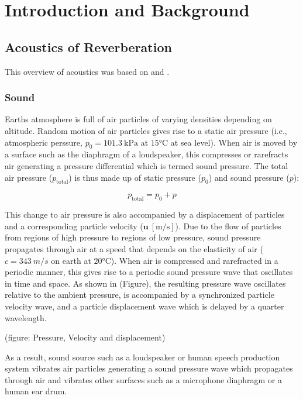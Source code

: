 \chapter{Introduction and Background}

\section{Acoustics of Reverberation}

This overview of acoustics was based on \cite{beranek2012acoustics} and \cite{kuttruff2016room}.

\subsection{Sound}

Earths atmosphere is full of air particles of varying densities depending on altitude. Random motion of air particles gives rise to a static air pressure (i.e., atmospheric perssure, $p_0 = \qty{101.3}{\kilo\pascal}$ at $15\unit{\degreeCelsius}$ at sea level). When air is moved by a surface such as the diaphragm of a loudspeaker, this compresses or rarefracts air generating a pressure differential which is termed sound pressure. The total air pressure ($p_\mathrm{total}$) is thus made up of static pressure ($p_0$) and sound pressure ($p$):

\[ p_\mathrm{total} = p_0 + p \]

This change to air pressure is also accompanied by a displacement of particles and a corresponding particle velocity ($\mathbf{u}\:[\unit{\metre\per\second}]$). Due to the flow of particles from regions of high pressure to regions of low pressure, sound pressure propagates through air at a speed that depends on the elasticity of air ($c=343 \: m/s$ on earth at $20\unit{\degreeCelsius}$). When air is compressed and rarefracted in a periodic manner, this gives rise to a periodic sound pressure wave that oscillates in time and space. As shown in (Figure), the resulting pressure wave oscillates relative to the ambient pressure, is accompanied by a synchronized particle velocity wave, and a particle displacement wave which is delayed by a quarter wavelength.

(figure: Pressure, Velocity and displacement)

As a result, sound source such as a loudspeaker or human speech production system vibrates air particles generating a sound pressure wave which propagates through air and vibrates other surfaces such as a microphone diaphragm or a human ear drum.

